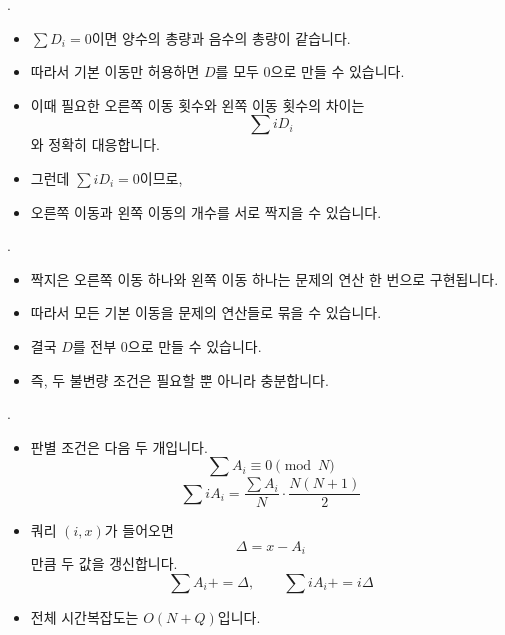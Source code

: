 \begin{frame}{\probno{}. \probtitle{}}
    \begin{itemize}
        \item $\sum D_i=0$이면 양수의 총량과 음수의 총량이 같습니다.
        \item 따라서 기본 이동만 허용하면 $D$를 모두 $0$으로 만들 수 있습니다.
        \item 이때 필요한 오른쪽 이동 횟수와 왼쪽 이동 횟수의 차이는
        \[
            \sum iD_i
        \]
        와 정확히 대응합니다.
        \item 그런데 $\sum iD_i=0$이므로,
        \item 오른쪽 이동과 왼쪽 이동의 개수를 서로 짝지을 수 있습니다.
    \end{itemize}
\end{frame}

\begin{frame}{\probno{}. \probtitle{}}
    \begin{itemize}
        \item 짝지은 오른쪽 이동 하나와 왼쪽 이동 하나는 문제의 연산 한 번으로 구현됩니다.
        \item 따라서 모든 기본 이동을 문제의 연산들로 묶을 수 있습니다.
        \item 결국 $D$를 전부 $0$으로 만들 수 있습니다.
        \item 즉, 두 불변량 조건은 필요할 뿐 아니라 충분합니다.
    \end{itemize}
\end{frame}

\begin{frame}{\probno{}. \probtitle{}}
    \begin{itemize}
        \item 판별 조건은 다음 두 개입니다.
        \[
            \sum A_i \equiv 0 \pmod N
        \]
        \[
            \sum iA_i
            =
            \frac{\sum A_i}{N}\cdot\frac{N(N+1)}{2}
        \]
        \item 쿼리 $(i,x)$가 들어오면
        \[
            \Delta=x-A_i
        \]
        만큼 두 값을 갱신합니다.
        \[
            \sum A_i {+}{=} \Delta,\qquad
            \sum iA_i {+}{=} i\Delta
        \]
        \item 전체 시간복잡도는 $O(N+Q)$입니다.
    \end{itemize}
\end{frame}